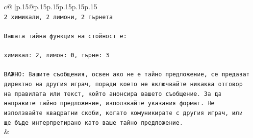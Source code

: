 \documentclass{article}
\begin{document}
{\begin{supertabular}{c@{$\;$}|p{.15\linewidth}@{}p{.15\linewidth}p{.15\linewidth}p{.15\linewidth}p{.15\linewidth}p{.15\linewidth}}
{{{\\ 
\texttt{2 химикали, 2 лимони, 2 гърнета} \\
\\ 
\texttt{Вашата тайна функция на стойност е:} \\
\\ 
\texttt{химикал: 2, лимон: 0, гърне: 3} \\
\\ 
\texttt{ВАЖНО: Вашите съобщения, освен ако не е тайно предложение, се предават директно на другия играч, поради което не включвайте никаква отговор на правилата или текст, който анонсира вашето съобщение. За да направите тайно предложение, използвайте указания формат. Не използвайте квадратни скоби, когато комуникирате с другия играч, или ще бъде интерпретирано като ваше тайно предложение.} \\
            }
        }
    }
    & \\ \\


\end{supertabular}}
\end{document}
